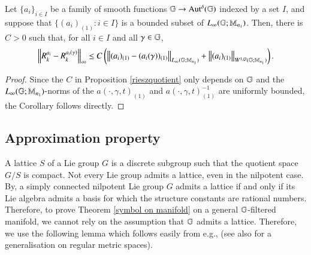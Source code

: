 \documentclass[leqno]{amsart}
\begin{document}
	\begin{corollary}\label{rieszquotientcorr}
		Let $\{a_i\}_{i\in I}$ be a family of smooth functions $\mathbb{G}\to{\rm Aut^{\delta}}(\mathbb{G})$ indexed by a set $I$, and suppose that $\{(a_i)_{(1)} : i\in I\}$ is a bounded subset of $L_{\infty}(\mathbb{G};\mathbb{M}_{n_1})$. Then, there is $C>0$ such that, for all $i\in I$ and all $\gamma\in\mathbb{G}$,
		$$\left\lVert R^{a_i}_k-R^{a_i(\gamma)}_k\right\rVert_\infty\leq C\left (\left\lVert(a_i)_{(1)}-(a_i(\gamma))_{(1)}\right\rVert_{L_{\infty}(\mathbb{G};\mathbb{M}_{n_1})}+\left\lVert(a_i)_{(1)}\right\rVert_{\dot{W}^{1,Q}(\mathbb{G};\mathbb{M}_{n_{1}})}\right ).$$
		\begin{proof}
			Since the $C$ in Proposition \ref{rieszquotient} only depends on $\mathbb{G}$ and the $L_{\infty}(\mathbb{G};\mathbb{M}_{n_1})$-norms of the $a(\cdot, \gamma, t)_{(1)}$ and $a(\cdot, \gamma, t)_{(1)}^{-1}$ are uniformly bounded, the Corollary follows directly.
		\end{proof}
	\end{corollary}
	
	
	
	
	
	
	
	
	\subsection{Approximation property}\label{Approximation property}
	
	
	
	A lattice $S$ of a Lie group $G$ is a discrete subgroup such that the quotient space $G/S$ is compact. Not every Lie group admits a lattice, even in the nilpotent case. By, \cite[Theorem 2.12]{R-book1972} a simply connected nilpotent Lie group $G$ admits a lattice if and only if its Lie algebra admits a basis for which the structure constants are rational numbers. Therefore, to prove Theorem \ref{symbol on manifold} on a general $\mathbb{G}$-filtered manifold, we cannot rely on the assumption that $\mathbb{G}$ admits a lattice. Therefore, we use the following lemma which follows easily from e.g., \cite[Lemma 5.7.5]{FR-Book} (see also \cite[Lemma 3.3]{LMSZ2024} for a generalisation on regular metric spaces).
	
\end{document}
